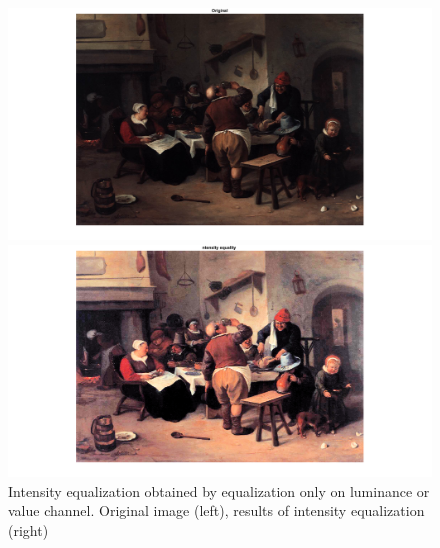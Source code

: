 \documentclass[conference]{IEEEtran}
\begin{document}
\begin{figure}[ht]
\begin{multicols}{2}
    \includegraphics[width=1\linewidth]{inteq11.png}\par 
    \includegraphics[width=1\linewidth]{inteq12.png}\par 
    \end{multicols}
\caption{Intensity equalization obtained by equalization only on luminance or value channel. Original image (left), results of intensity equalization (right)}
\label{int_1}
\end{figure}
\end{document}
